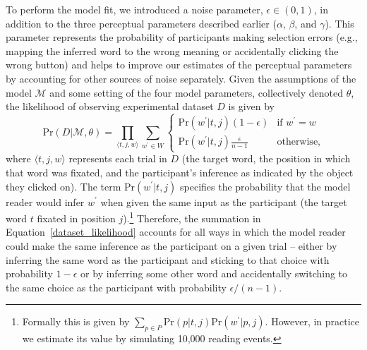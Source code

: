 \documentclass[doc,biblatex]{apa7}
\begin{document}
To perform the model fit, we introduced a noise parameter, $\epsilon \in (0, 1)$, in addition to the three perceptual parameters described earlier ($\alpha$, $\beta$, and $\gamma$). This parameter represents the probability of participants making selection errors (e.g., mapping the inferred word to the wrong meaning or accidentally clicking the wrong button) and helps to improve our estimates of the perceptual parameters by accounting for other sources of noise separately. Given the assumptions of the model $\mathcal{M}$ and some setting of the four model parameters, collectively denoted $\theta$, the likelihood of observing experimental dataset $D$ is given by
\begin{equation}
\mathrm{Pr}(D|\mathcal{M},\theta) = \prod_{\langle t,j,w \rangle} \sum_{w^\prime \in W}
    \begin{cases}
    \mathrm{Pr}(w^\prime|t,j)(1 - \epsilon)       & \text{if $w^\prime = w$} \\
    \mathrm{Pr}(w^\prime|t,j)\frac{\epsilon}{n-1} & \text{otherwise,}
    \end{cases}
\label{dataset_likelihood}
\end{equation}
where $\langle t,j,w \rangle$ represents each trial in $D$ (the target word, the position in which that word was fixated, and the participant's inference as indicated by the object they clicked on). The term $\mathrm{Pr}(w^\prime|t,j)$ specifies the probability that the model reader would infer $w^\prime$ when given the same input as the participant (the target word $t$ fixated in position $j$).\footnote{Formally this is given by $\sum_{p \in P} \mathrm{Pr}(p|t,j) \mathrm{Pr}(w^\prime|p,j)$. However, in practice we estimate its value by simulating 10,000 reading events.} Therefore, the summation in Equation~\ref{dataset_likelihood} accounts for all ways in which the model reader could make the same inference as the participant on a given trial -- either by inferring the same word as the participant and sticking to that choice with probability $1-\epsilon$ or by inferring some other word and accidentally switching to the same choice as the participant with probability $\epsilon / (n-1)$.
\end{document}

